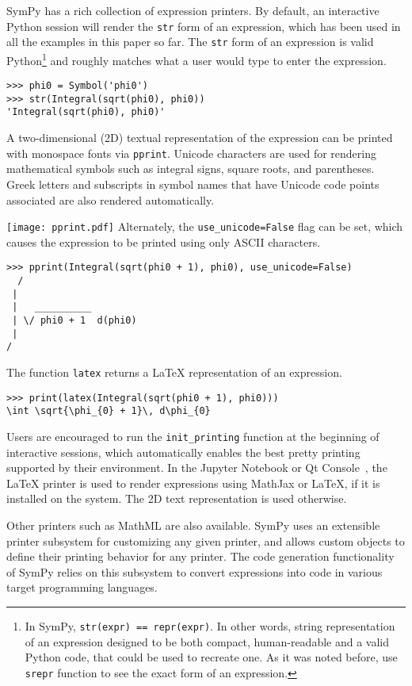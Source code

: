 SymPy has a rich collection of expression printers.
By default, an interactive Python session will render the
\verb|str| form of an expression, which has been used in all the examples in
this paper so far. The \verb|str| form of an expression is valid
Python\footnote{In SymPy, \texttt{str(expr) == repr(expr)}.  In other words,
string representation of an expression designed to be both compact,
human-readable and a valid Python code, that could be used to
recreate one.  As it was noted before, use \texttt{srepr} function to
see the exact form of an expression.} and
roughly matches what a user would type to enter the expression.

\begin{verbatim}
>>> phi0 = Symbol('phi0')
>>> str(Integral(sqrt(phi0), phi0))
'Integral(sqrt(phi0), phi0)'
\end{verbatim}

A two-dimensional (2D) textual representation of the expression can
be printed with monospace fonts via \verb|pprint|.
Unicode characters are used for rendering mathematical symbols such as integral signs,
square roots, and parentheses. Greek letters and subscripts in symbol names
that have Unicode code points associated
are also rendered automatically.

\noindent
\texttt{[image: pprint.pdf]}
Alternately, the \verb|use_unicode=False| flag can be set, which causes the
expression to be printed using only ASCII characters.

\begin{verbatim}
>>> pprint(Integral(sqrt(phi0 + 1), phi0), use_unicode=False)
  /
 |
 |   __________
 | \/ phi0 + 1  d(phi0)
 |
/
\end{verbatim}

The function \verb|latex| returns a \LaTeX{} representation of an expression.

\begin{verbatim}
>>> print(latex(Integral(sqrt(phi0 + 1), phi0)))
\int \sqrt{\phi_{0} + 1}\, d\phi_{0}
\end{verbatim}

Users are encouraged to run the \verb|init_printing| function at the beginning
of interactive sessions, which automatically enables the best pretty printing
supported by their environment. In the Jupyter Notebook or Qt
Console~\cite{perez2007ipython}, the \LaTeX{} printer is used to render
expressions using MathJax or \LaTeX{}, if it is installed on the system. The
2D text representation is used otherwise.

Other printers such as MathML are also available. SymPy uses an extensible
printer subsystem for customizing any given
printer, and allows custom objects to define their printing behavior for any
printer. The code generation functionality of SymPy
relies on this subsystem to convert expressions into code in various target
programming languages.
